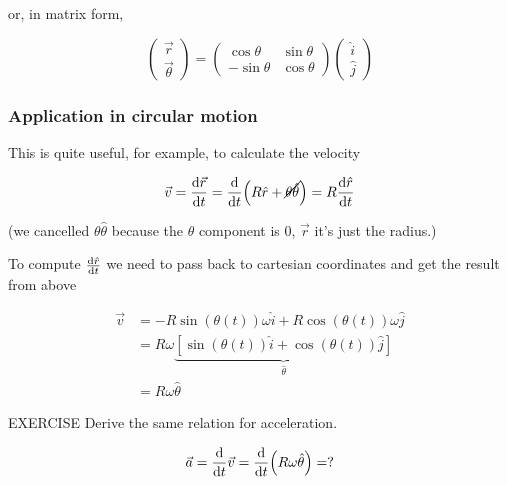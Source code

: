 \documentclass[14pt]{extarticle}
\begin{document}
or, in matrix form,

$$
  \begin{pmatrix}
    \vec r \\
    \vec \theta
  \end{pmatrix}
  =
  \begin{pmatrix}
    \cos \theta  & \sin \theta \\
    -\sin \theta & \cos \theta
  \end{pmatrix}
  \begin{pmatrix}
    \hat i \\
    \hat j
  \end{pmatrix}
$$

\subsubsection{Application in circular motion}

This is quite useful, for example, to calculate the velocity

$$
  \vec v = \dv {\vec r}{t} = \dv{t} (R \hat r + \cancel{\theta \hat \theta})
  = R \dv{\hat r}{t}
$$

(we cancelled $\theta \hat \theta$ because the $\theta$ component is 0, $\vec r$ it's just the radius.)

To compute $\dv{\hat r}{t}$ we need to pass back to cartesian coordinates and get the result from above

\begin{align*}
  \vec{v} & = - R \sin (\theta(t)) \omega \hat i + R \cos (\theta(t)) \omega \hat j                   \\
          & = R \omega \underbrace{[\sin (\theta(t)) \hat i + \cos (\theta(t)) \hat j]}_{\hat \theta} \\
          & = R \omega \hat \theta
\end{align*}

\begin{bluebox}{EXERCISE}
  Derive the same relation for acceleration.

  $$
    \vec{a} = \dv {t} \vec v = \dv{t}(R \omega \hat \theta) = ?
  $$
\end{bluebox}
\end{document}
